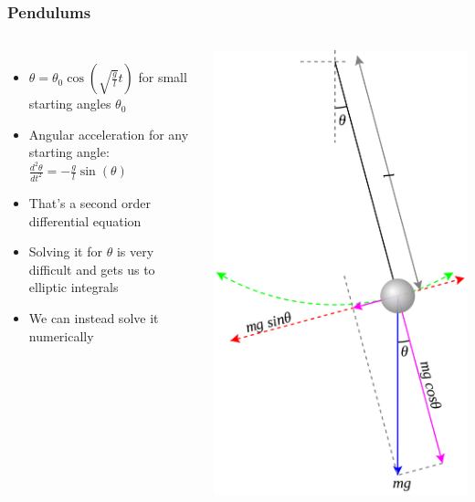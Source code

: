 \documentclass[aspectratio=169, t]{beamer}
\begin{document}
\begin{frame}
	\frametitle{Pendulums}
	\begin{columns}[T]
		\begin{itemize}
			\item $\theta = \theta_0\cos\left(\sqrt{\frac{g}{l}}t\right)$ for small starting angles $\theta_0$
			\item Angular acceleration for any starting angle: $\frac{d^2\theta}{dt^2} = -\frac{g}{l}\sin(\theta)$
			\item That's a second order differential equation
			\item Solving it for $\theta$ is very difficult and gets us to elliptic integrals 
			\item We can instead solve it numerically
		\end{itemize}

		\centering
		\includegraphics[height=0.75\textheight]{images/pendulum-diagram.png}
	\end{columns}
\end{frame}
\end{document}
